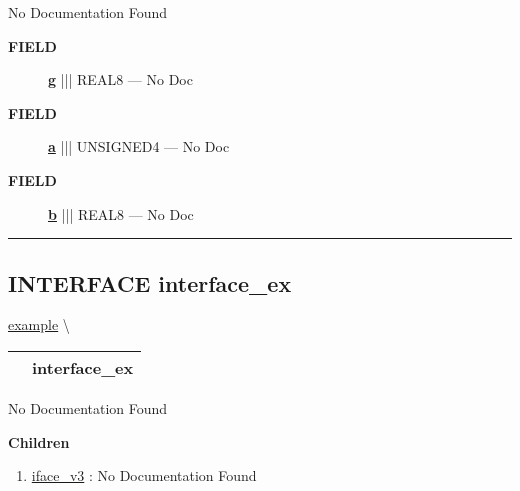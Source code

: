 \par





No Documentation Found







\par
\begin{description}
\item [\colorbox{tagtype}{\color{white} \textbf{\textsf{FIELD}}}] \textbf{\underline{g}} ||| REAL8 --- No Doc
\item [\colorbox{tagtype}{\color{white} \textbf{\textsf{FIELD}}}] \textbf{\underline{a}} ||| UNSIGNED4 --- No Doc
\item [\colorbox{tagtype}{\color{white} \textbf{\textsf{FIELD}}}] \textbf{\underline{b}} ||| REAL8 --- No Doc
\end{description}





\rule{\linewidth}{0.5pt}
\subsection*{\textsf{\colorbox{headtoc}{\color{white} INTERFACE}
interface\_ex}}

\hypertarget{ecldoc:example.interface_ex}{}
\hspace{0pt} \hyperlink{ecldoc:example}{example} \textbackslash 

{\renewcommand{\arraystretch}{1.5}
\begin{tabularx}{\textwidth}{|>{\raggedright\arraybackslash}l|X|}
\hline
\hspace{0pt}\mytexttt{\color{red} } & \textbf{interface\_ex} \\
\hline
\end{tabularx}
}

\par





No Documentation Found







\textbf{Children}
\begin{enumerate}
\item \hyperlink{ecldoc:example.interface_ex.iface_v3}{iface\_v3}
: No Documentation Found
\end{enumerate}

